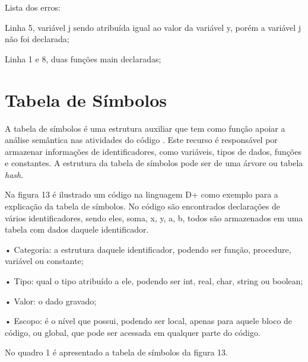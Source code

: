 \documentclass[12pt,oneside,a4paper,chapter=TITLE,section=TITLE,sumario=tradicional]{abntex2}
\begin{document}
Lista dos erros:

\begin{lista}
	\item Linha 5, variável j sendo atribuída igual ao valor da variável y, porém a variável j não foi declarada;
	\item Linha 1 e 8, duas funções main declaradas;
\end{lista}

\section{Tabela de Símbolos}
\label{sec:tabela-semantica}

A tabela de símbolos é uma estrutura auxiliar que tem como função apoiar a análise semântica nas atividades do código \cite{ricarte2008}. Este recurso é responsável por armazenar informações de identificadores, como variáveis, tipos de dados, funções e constantes. A estrutura da tabela de símbolos pode ser de uma árvore ou tabela \textit{hash}.

Na figura 13 é ilustrado um código na linguagem D+ como exemplo para a explicação da tabela de símbolos. No código são encontrados declarações de vários identificadores, sendo eles, soma, x, y, a, b, todos são armazenados em uma tabela com dados daquele identificador.

\begin{figure}[htb]
\end{figure}

•	Categoria: a estrutura daquele identificador, podendo ser função, procedure, variável ou constante;

•	Tipo: qual o tipo atribuído a ele, podendo ser int, real, char, string ou boolean;

•	Valor: o dado gravado;

•	Escopo: é o nível que possui, podendo ser local, apenas para aquele bloco de código, ou global, que pode ser acessada em qualquer parte do código.

No quadro 1 é apresentado a tabela de símbolos da figura 13.
\end{document}
